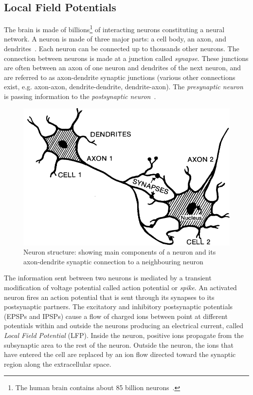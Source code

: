 \subsection{Local Field Potentials}
\label{neuron_electro}
The brain is made of billions\footnote{The human brain contains about 85 billion neurons~\citep{herculano-houzel_remarkable_2013}.} of interacting neurons constituting a neural network.
A neuron is made of three major parts: a cell body, an axon, and dendrites~\citep{purves_neuroscience_2008}. 
Each neuron can be connected up to thousands other neurons. 
The connection between neurons is made at a junction called \emph{synapse}. 
These junctions are often between an axon of one neuron and dendrites of the next neuron, and are referred to as axon-dendrite synaptic junctions (various other connections exist, e.g. axon-axon, dendrite-dendrite, dendrite-axon). 
The \emph{presynaptic neuron} is passing information to the \emph{postsynaptic neuron}~\citep{herculano-houzel_human_2009,purves_excitatory_2001}.

\begin{figure}[!h]
\centering
\includegraphics[width=0.5\columnwidth]{Figures/neuron-structure.png}
\caption{Neuron structure: showing main components of a neuron and its axon-dendrite synaptic connection to a neighbouring neuron \citep{purves_excitatory_2001}}
\end{figure}

The information sent between two neurons is mediated by a transient modification of voltage potential called action potential or \emph{spike}.
An activated neuron fires an action potential that is sent through its synapses to its postsynaptic partners. 
The excitatory and inhibitory postsynaptic potentials (EPSPs and IPSPs) cause a flow of charged ions between point at different potentials within and outside the neurons producing an electrical current, called \emph{Local Field Potential} (LFP).
Inside the neuron, positive ions propagate from the subsynaptic area to the rest of the neuron. 
Outside the neuron, the ions that have entered the cell are replaced by an ion flow directed toward the synaptic region along the extracellular space.

